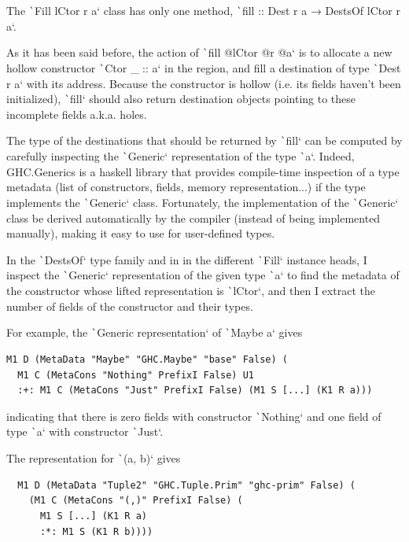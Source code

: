 \documentclass[english]{jflart}
\begin{document}
The \texttt`Fill lCtor r a` class has only one method, \texttt`fill :: Dest r a → DestsOf lCtor r a`.

As it has been said before, the action of \texttt`fill @lCtor @r @a` is to allocate a new hollow constructor \texttt`Ctor _ :: a` in the region, and fill a destination of type \texttt`Dest r a` with its address. Because the constructor is hollow (i.e. its fields haven't been initialized), \texttt`fill` should also return destination objects pointing to these incomplete fields a.k.a. holes.

The type of the destinations that should be returned by \texttt`fill` can be computed by carefully inspecting the \texttt`Generic` representation of the type \texttt`a`. Indeed, GHC.Generics is a haskell library that provides compile-time inspection of a type metadata (list of constructors, fields, memory representation...) if the type implements the \texttt`Generic` class. Fortunately, the implementation of the \texttt`Generic` class be derived automatically by the compiler (instead of being implemented manually), making it easy to use for user-defined types.

In the \texttt`DestsOf` type family and in in the different \texttt`Fill` instance heads, I inspect the \texttt`Generic` representation of the given type \texttt`a` to find the metadata of the constructor whose lifted representation is \texttt`lCtor`, and then I extract the number of fields of the constructor and their types.

For example, the \texttt`Generic representation` of \texttt`Maybe a` gives

{\small
\begin{verbatim}
M1 D (MetaData "Maybe" "GHC.Maybe" "base" False) (
  M1 C (MetaCons "Nothing" PrefixI False) U1
  :+: M1 C (MetaCons "Just" PrefixI False) (M1 S [...] (K1 R a)))
\end{verbatim}
}

indicating that there is zero fields with constructor \texttt`Nothing` and one field of type \texttt`a` with constructor \texttt`Just`. 


The representation for \texttt`(a, b)` gives

{\small
\begin{verbatim}
  M1 D (MetaData "Tuple2" "GHC.Tuple.Prim" "ghc-prim" False) (
    (M1 C (MetaCons "(,)" PrefixI False) (
      M1 S [...] (K1 R a)
      :*: M1 S (K1 R b))))
\end{verbatim}
}
\end{document}
